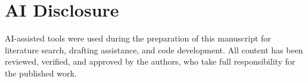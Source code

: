 \documentclass[review]{elsarticle}
\begin{document}
\section*{AI Disclosure}

AI-assisted tools were used during the preparation of this manuscript for literature search, drafting assistance, and code development. All content has been reviewed, verified, and approved by the authors, who take full responsibility for the published work.




\end{document}

